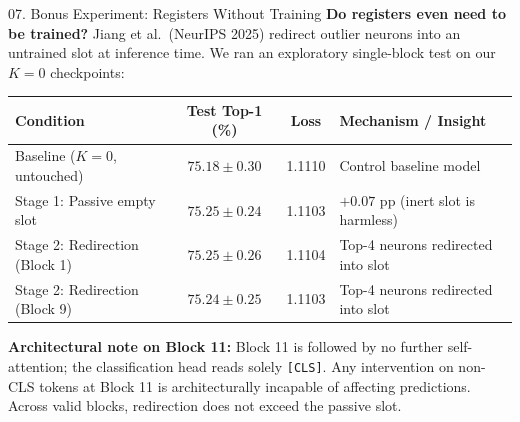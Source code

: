 \documentclass[aspectratio=169]{beamer}
\begin{document}
\begin{frame}{07. Bonus Experiment: Registers Without Training}
\small
\textbf{Do registers even need to be trained?} Jiang et al.\ (NeurIPS 2025) redirect outlier neurons into an untrained slot at inference time. We ran an exploratory single-block test on our $K=0$ checkpoints:

\smallskip
\begin{center}
\footnotesize
\setlength{\tabcolsep}{4pt}
\begin{tabular}{lccl}
\toprule
\textbf{Condition} & \textbf{Test Top-1 (\%)} & \textbf{Loss} & \textbf{Mechanism / Insight} \\
\midrule
Baseline ($K=0$, untouched) & $75.18 \pm 0.30$ & 1.1110 & Control baseline model \\
Stage 1: Passive empty slot & $75.25 \pm 0.24$ & 1.1103 & $+0.07$ pp (inert slot is harmless) \\
Stage 2: Redirection (Block 1) & $75.25 \pm 0.26$ & 1.1104 & Top-4 neurons redirected into slot \\
Stage 2: Redirection (Block 9) & $75.24 \pm 0.25$ & 1.1103 & Top-4 neurons redirected into slot \\
\bottomrule
\end{tabular}
\end{center}

\smallskip
\footnotesize
\textbf{Architectural note on Block 11:} Block 11 is followed by no further self-attention; the classification head reads solely \texttt{[CLS]}. Any intervention on non-CLS tokens at Block 11 is architecturally incapable of affecting predictions. Across valid blocks, redirection does not exceed the passive slot.
\end{frame}
\end{document}
